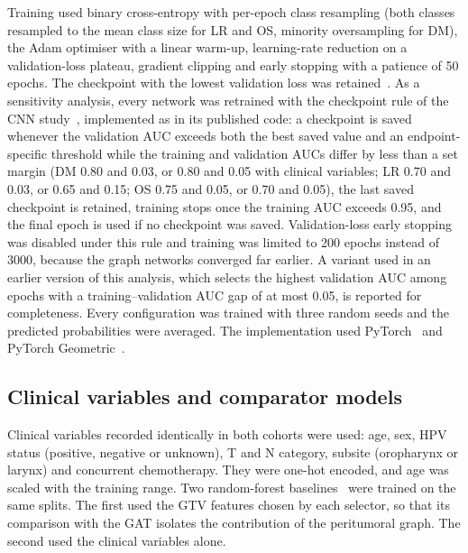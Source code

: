 \documentclass[11pt,a4paper]{article}
\begin{document}
Training used binary cross-entropy with per-epoch class resampling (both classes resampled to the mean class size for LR and OS, minority oversampling for DM), the Adam optimiser with a linear warm-up, learning-rate reduction on a validation-loss plateau, gradient clipping and early stopping with a patience of 50 epochs. The checkpoint with the lowest validation loss was retained~\cite{bae2025spatial}. As a sensitivity analysis, every network was retrained with the checkpoint rule of the CNN study~\cite{mateus2023}, implemented as in its published code: a checkpoint is saved whenever the validation AUC exceeds both the best saved value and an endpoint-specific threshold while the training and validation AUCs differ by less than a set margin (DM 0.80 and 0.03, or 0.80 and 0.05 with clinical variables; LR 0.70 and 0.03, or 0.65 and 0.15; OS 0.75 and 0.05, or 0.70 and 0.05), the last saved checkpoint is retained, training stops once the training AUC exceeds 0.95, and the final epoch is used if no checkpoint was saved. Validation-loss early stopping was disabled under this rule and training was limited to 200 epochs instead of 3000, because the graph networks converged far earlier. A variant used in an earlier version of this analysis, which selects the highest validation AUC among epochs with a training--validation AUC gap of at most 0.05, is reported for completeness. Every configuration was trained with three random seeds and the predicted probabilities were averaged. The implementation used PyTorch~\cite{paszke2019pytorch} and PyTorch Geometric~\cite{fey2019pyg}.

\subsection{Clinical variables and comparator models}
Clinical variables recorded identically in both cohorts were used: age, sex, HPV status (positive, negative or unknown), T and N category, subsite (oropharynx or larynx) and concurrent chemotherapy. They were one-hot encoded, and age was scaled with the training range. Two random-forest baselines~\cite{breiman2001rf,pedregosa2011sklearn} were trained on the same splits. The first used the GTV features chosen by each selector, so that its comparison with the GAT isolates the contribution of the peritumoral graph. The second used the clinical variables alone.
\end{document}
